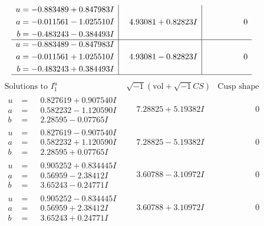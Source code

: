 \documentclass[1p]{elsarticle_modified}
\theoremstyle{definition}
\newcommand{\I}{\sqrt{-1}}
\begin{document}
$$\begin{array}{c|c|c}
\begin{aligned}
u &= -0.883489 + 0.847983 I \\
a &= -0.011561 - 1.025510 I \\
b &= -0.483243 - 0.384493 I\end{aligned}
 & \phantom{-}4.93081 + 0.82823 I & \phantom{-0.000000 } 0 \\ \hline\begin{aligned}
u &= -0.883489 - 0.847983 I \\
a &= -0.011561 + 1.025510 I \\
b &= -0.483243 + 0.384493 I\end{aligned}
 & \phantom{-}4.93081 - 0.82823 I & \phantom{-0.000000 } 0\\
 \hline 
 \end{array}$$\newpage$$\begin{array}{c|c|c}  
\text{Solutions to }I^u_{1}& \I (\text{vol} + \sqrt{-1}CS) & \text{Cusp shape}\\
 \hline 
\begin{aligned}
u &= \phantom{-}0.827619 + 0.907540 I \\
a &= \phantom{-}0.582232 - 1.120590 I \\
b &= \phantom{-}2.28595 - 0.07765 I\end{aligned}
 & \phantom{-}7.28825 + 5.19382 I & \phantom{-0.000000 } 0 \\ \hline\begin{aligned}
u &= \phantom{-}0.827619 - 0.907540 I \\
a &= \phantom{-}0.582232 + 1.120590 I \\
b &= \phantom{-}2.28595 + 0.07765 I\end{aligned}
 & \phantom{-}7.28825 - 5.19382 I & \phantom{-0.000000 } 0 \\ \hline\begin{aligned}
u &= \phantom{-}0.905252 + 0.834445 I \\
a &= \phantom{-}0.56959 - 2.38412 I \\
b &= \phantom{-}3.65243 - 0.24771 I\end{aligned}
 & \phantom{-}3.60788 - 3.10972 I & \phantom{-0.000000 } 0 \\ \hline\begin{aligned}
u &= \phantom{-}0.905252 - 0.834445 I \\
a &= \phantom{-}0.56959 + 2.38412 I \\
b &= \phantom{-}3.65243 + 0.24771 I\end{aligned}
 & \phantom{-}3.60788 + 3.10972 I & \phantom{-0.000000 } 0 \\ \hline\begin{aligned}

\end{aligned}
\end{array}$$
\end{document}
